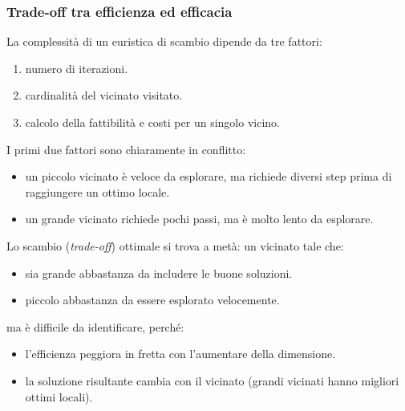 \documentclass{article}
\begin{document}
\subsubsection{Trade-off tra efficienza ed efficacia}
La complessità di un euristica di scambio dipende da tre fattori:
\begin{enumerate}
    \item numero di iterazioni.
    \item cardinalità del vicinato visitato.
    \item calcolo della fattibilità e costi per un singolo vicino.
\end{enumerate}
I primi due fattori sono chiaramente in conflitto:
\begin{itemize}
    \item un piccolo vicinato è veloce da esplorare, ma richiede diversi step prima di
    raggiungere un ottimo locale.
    \item un grande vicinato richiede pochi passi, ma è molto lento da esplorare.
\end{itemize}
Lo scambio (\textit{trade-off}) ottimale si trova a metà: un vicinato tale che:
\begin{itemize}
    \item sia grande abbastanza da includere le buone soluzioni.
    \item piccolo abbastanza da essere esplorato velocemente.
\end{itemize}
ma è difficile da identificare, perché:
\begin{itemize}
    \item l'efficienza peggiora in fretta con l'aumentare della dimensione.
    \item la soluzione risultante cambia con il vicinato (grandi vicinati hanno migliori ottimi locali).
\end{itemize}
\end{document}
